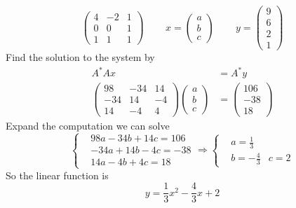 \begin{homeworkProblem}
\begin{enumerate}[label=(\roman*)]
\[\begin{pmatrix}
            4 & -2 & 1 \\
            0 & 0 & 1 \\
            1 & 1 & 1
        \end{pmatrix}
        \quad \, \quad
        x = \begin{pmatrix}
            a \\ b \\ c
        \end{pmatrix}
        \quad \, \quad
        y = \begin{pmatrix}
            9 \\
            6 \\
            2 \\
            1
        \end{pmatrix}
    \]
    Find the solution to the system by \[
        \begin{aligned}
            A^* Ax &= A^* y\\
            \begin{pmatrix}
                98 & -34 & 14\\
                -34 & 14 & -4\\
                14 & -4 & 4
            \end{pmatrix}\begin{pmatrix}
                a \\ b\\ c
            \end{pmatrix} &= \begin{pmatrix}
                106 \\ -38 \\ 18
            \end{pmatrix}
        \end{aligned}
        \]
        Expand the computation we can solve \[
        \left\{
        \begin{aligned}
        &98a -34b +14c = 106 \\
        &-34a + 14b -4c = -38 \\
        &14a -4b +4c = 18
        \end{aligned}
        \right.
        \Longrightarrow
        \left\{
        \begin{aligned}
        &a = \frac{1}{3}\\
        &b = -\frac{4}{3}
        &c = 2
        \end{aligned}
        \right.
        \]
        So the linear function is \[
            y = \frac{1}{3}x^2 - \frac{4}{3}x + 2
\]
\end{enumerate}
\end{homeworkProblem}
